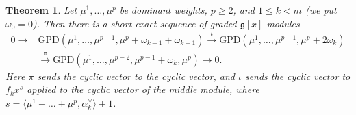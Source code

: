 \documentclass[11pt]{amsart}
\numberwithin{equation}{section}
\newtheorem{theorem}[equation]{Theorem}
\theoremstyle{definition}
\newcommand{\fg}{\mathfrak{g}}
\newcommand{\GPD}{\mathrm{GPD}}         %
\begin{document}
	
	\begin{theorem}\label{thm:SES}
		Let $\mu^1,\dots,\mu^p$ be dominant weights, $p\ge2$, and $1\le k<m$ (we put $\omega_0=0$). Then there is a short exact sequence of graded $\fg[x]$-modules
		\begin{equation}\label{eq:SES}
			\begin{aligned}
				0\to{}&\GPD(\mu^1,\dots,\mu^{p-1},\mu^p+\omega_{k-1}+\omega_{k+1})\xrightarrow{\ \iota\ }\GPD(\mu^1,\dots,\mu^{p-1},\mu^p+2\omega_k)\\
				&\xrightarrow{\ \pi\ }\GPD(\mu^1,\dots,\mu^{p-2},\mu^{p-1}+\omega_k,\mu^p)\to0.
			\end{aligned}
		\end{equation}
		Here $\pi$ sends the cyclic vector to the cyclic vector, and $\iota$ sends the cyclic vector to $f_kx^{s}$ applied to the cyclic vector of the middle module, where $s=\langle\mu^1+\dots+\mu^p,\alpha_k^\vee\rangle+1$.
	\end{theorem}
	
\end{document}
